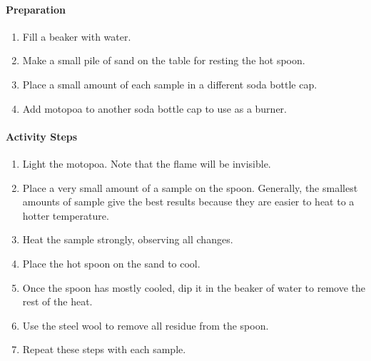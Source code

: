 \paragraph{Preparation}
\begin{enumerate}
\item{Fill a beaker with water.}
\item{Make a small pile of sand on the table for resting the hot spoon.}
\item{Place a small amount of each sample in a different soda bottle cap.}
\item{Add motopoa to another soda bottle cap to use as a burner.}
\end{enumerate}

\paragraph{Activity Steps}
\begin{enumerate}
\item{Light the motopoa. Note that the flame will be invisible.}
\item{Place a very small amount of a sample on the spoon. Generally, the smallest amounts of sample give the best results because they are easier to heat to a hotter temperature.}
\item{Heat the sample strongly, observing all changes.}
\item{Place the hot spoon on the sand to cool.}
\item{Once the spoon has mostly cooled, dip it in the beaker of water to remove the rest of the heat.}
\item{Use the steel wool to remove all residue from the spoon.}
\item{Repeat these steps with each sample.}
\end{enumerate}

